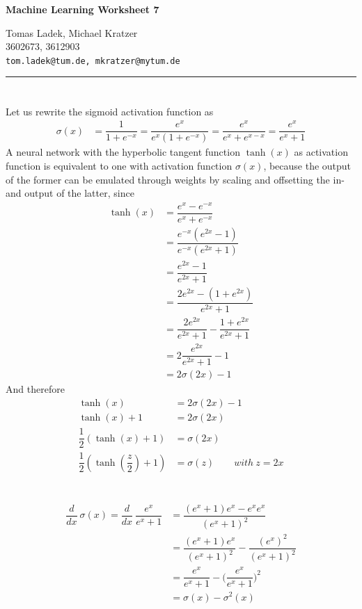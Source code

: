 \documentclass[11pt]{article}
\makeatletter
\newcommand{\exercise}{\section{}}
\newcommand{\hwhead}[4]{
\begin{center}
\sffamily\large\bfseries Machine Learning Worksheet #1
\vspace{2mm}
\normalfont

#2\\
#3\\
\texttt{#4}
\end{center}
\vspace{6mm} \hrule \vspace{4mm}
}
\newcommand{\names}{Tomas Ladek, Michael Kratzer} %
\newcommand{\imats}{3602673, 3612903} %
\newcommand{\emails}{tom.ladek@tum.de, mkratzer@mytum.de} %
\makeatother
\begin{document}
\hwhead{7}{\names}{\imats}{\emails}


\exercise
Let us rewrite the sigmoid activation function as
\begin{align*}
	\sigma(x) &= \dfrac{1}{1 + e^{-x}} = \dfrac{e^x}{e^x (1 + e^{-x})} = \dfrac{e^x}{e^x + e^{x-x}} = \dfrac{e^x}{e^x + 1}
\end{align*}
A neural network with the hyperbolic tangent function $\tanh(x)$ as activation function is equivalent to one with activation function $\sigma(x)$, because the output of the former can be emulated through weights by scaling and offsetting the in- and output of the latter, since
\begin{align*}
	\tanh(x) &= \dfrac{e^x - e^{-x}}{e^x + e^{-x}} \\
	&= \dfrac{e^{-x} (e^{2x} - 1)}{e^{-x} (e^{2x} + 1)} \\
	&= \dfrac{e^{2x} - 1}{e^{2x} + 1} \\
	&= \dfrac{2e^{2x} - (1 + e^{2x})}{e^{2x} + 1} \\
	&= \dfrac{2e^{2x}}{e^{2x} + 1} - \dfrac{1 + e^{2x}}{e^{2x} + 1}\\
	&= 2 \dfrac{e^{2x}}{e^{2x} + 1} - 1\\
	&= 2 \sigma(2x) - 1
\end{align*}
And therefore
\begin{align*}
	\tanh(x) &= 2 \sigma(2x) - 1\\
	\tanh(x) + 1 &= 2 \sigma(2x)\\
	\dfrac{1}{2} (\tanh(x) + 1) &= \sigma(2x)\\
	\dfrac{1}{2} (\tanh(\dfrac{z}{2}) + 1) &= \sigma(z) \quad\quad with\ z = 2x	
\end{align*}

\exercise
\begin{align*}
	\dfrac{d}{dx}\ \sigma(x) = \dfrac{d}{dx}\ \dfrac{e^x}{e^x + 1} &= \dfrac{(e^x + 1) e^x - e^x e^x}{(e^x + 1)^2}\\
	&= \dfrac{(e^{x} + 1)e^x}{(e^x + 1)^2} - \dfrac{(e^{x})^2}{(e^x + 1)^2}\\
	&= \dfrac{e^x}{e^x + 1} - \Big(\dfrac{e^x}{e^x + 1}\Big)^2\\
	&= \sigma(x) - \sigma^2(x)
\end{align*}
\end{document}

